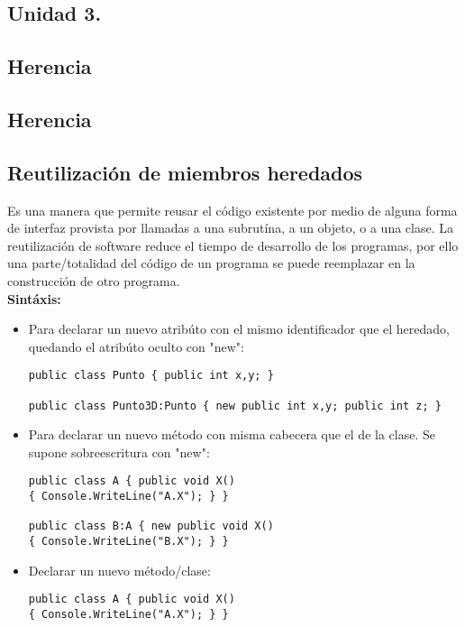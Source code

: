 \documentclass[letterpaper, 12pt]{article}
\begin{document}
    \newpage
        \justify
        \begin{huge}
            \bigbreak
            \bigbreak
            \bigbreak
            \section*{\huge{Unidad 3.}}
            \subsection*{\huge{Herencia}}
        \end{huge}

    \newpage
    \begin{justify}
        \section{Herencia}
        \subsection{Reutilización de miembros heredados}
        Es una manera que permite reusar el código existente por medio de alguna forma de interfaz provista por llamadas a una subrutína, a un objeto, o a una clase.
        La reutilización de software reduce el tiempo de desarrollo de los programas, por ello una parte/totalidad del código de un programa se puede reemplazar en la construcción
        de otro programa.
        \textbf{\\Sintáxis:}
        \begin{itemize}
            \item Para declarar un nuevo atribúto con el mismo identificador que el heredado, quedando el atribúto oculto con "new":
                \begin{verbatim}
public class Punto { public int x,y; }

public class Punto3D:Punto { new public int x,y; public int z; }
                \end{verbatim}
            \item Para declarar un nuevo método con misma cabecera que el de la clase. Se supone sobreescritura con "new":
                \begin{verbatim}
public class A { public void X()
{ Console.WriteLine("A.X"); } }

public class B:A { new public void X()
{ Console.WriteLine("B.X"); } }
                \end{verbatim}
            \item Declarar un nuevo método/clase:
                \begin{verbatim}
public class A { public void X()
{ Console.WriteLine("A.X"); } }


\end{verbatim}
\end{itemize}
\end{justify}
\end{document}
